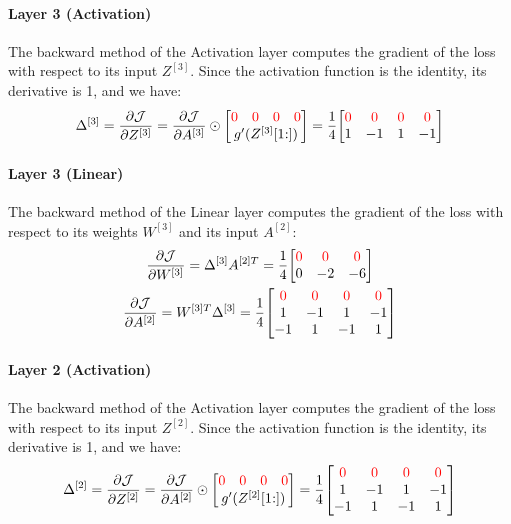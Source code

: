 \paragraph{Layer 3 (Activation)} The backward method of the Activation layer computes the gradient of the loss with respect to its input $Z^{[3]}$. Since the activation function is the identity, its derivative is 1, and we have:
\begin{equation*}
    \Delta^{[3]} = \pdv{\mathcal{J}}{Z^{[3]}} = \pdv{\mathcal{J}}{A^{[3]}} \odot \mqty[
        \mqty{\color{red} 0 & \color{red} 0 & \color{red} 0 & \color{red} 0} \\
        g'(Z^{[3]}[1\hspace{-0.6ex}:])
    ] = \frac{1}{4} \mqty[
        \color{red} 0 & \color{red} 0 & \color{red} 0 & \color{red} 0 \\
        1 & -1 & 1 & -1
    ]
\end{equation*}

\paragraph{Layer 3 (Linear)} The backward method of the Linear layer computes the gradient of the loss with respect to its weights $W^{[3]}$ and its input $A^{[2]}$:
\begin{gather*}
    \pdv{\mathcal{J}}{W^{[3]}} = \Delta^{[3]} A^{[2]T} = \frac{1}{4} \mqty[
        \color{red} 0 & \color{red} 0 & \color{red} 0 \\
        0 & -2 & -6
    ]\\
    \pdv{\mathcal{J}}{A^{[2]}} = W^{[3]T} \Delta^{[3]} = \frac{1}{4} \mqty[
        \color{red} 0 & \color{red} 0 & \color{red} 0 & \color{red} 0 \\
        1 & -1 & 1 & -1 \\
        -1 & 1 & -1 & 1
    ]
\end{gather*}

\paragraph{Layer 2 (Activation)} The backward method of the Activation layer computes the gradient of the loss with respect to its input $Z^{[2]}$. Since the activation function is the identity, its derivative is 1, and we have:
\begin{equation*}
    \Delta^{[2]} = \pdv{\mathcal{J}}{Z^{[2]}} = \pdv{\mathcal{J}}{A^{[2]}} \odot \mqty[
        \mqty{\color{red} 0 & \color{red} 0 & \color{red} 0 & \color{red} 0} \\
        g'(Z^{[2]}[1\hspace{-0.6ex}:])
    ] = \frac{1}{4} \mqty[
        \color{red} 0 & \color{red} 0 & \color{red} 0 & \color{red} 0 \\
        1 & -1 & 1 & -1 \\
        -1 & 1 & -1 & 1
    ]
\end{equation*}

